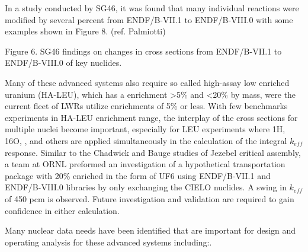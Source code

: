 \documentclass[letterpaper,draft]{ar-1col}
\begin{document}
In a study conducted by SG46, it was found that many individual reactions were modified by several percent from ENDF/B-VII.1 to ENDF/B-VIII.0 with some examples shown in Figure 8. (ref. Palmiotti)




Figure 6. SG46 findings on changes in cross sections from ENDF/B-VII.1 to ENDF/B-VIII.0 of key nuclides.

Many of these advanced systems also require so called high-assay low enriched uranium (HA-LEU), which has a  enrichment >5\% and <20\% by mass, were the current fleet of LWRs utilize enrichments of 5\% or less. With few benchmarks experiments in HA-LEU enrichment range, the interplay of the cross sections for multiple nuclei become important, especially for LEU experiments where 1H, 16O, ,  and others are applied simultaneously in the calculation of the integral $k_{eff}$ response.  Similar to the Chadwick \cite{Cha18} and Bauge \cite{Bau12} studies of Jezebel critical assembly, a team at ORNL preformed an investigation of a hypothetical transportation package with 20\% enriched  in the form of UF6 using ENDF/B-VII.1 and ENDF/B-VIII.0 libraries by only exchanging the CIELO nuclides. A swing in $k_{eff}$ of 450 pcm is observed.  Future investigation and validation are required to gain confidence in either calculation.

Many nuclear data needs have been identified that are important for design and operating analysis for these advanced systems including:.
\end{document}
